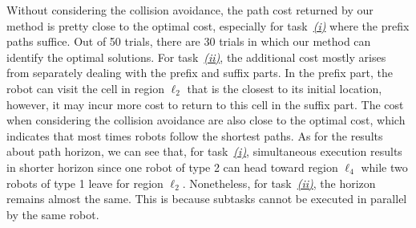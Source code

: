 \documentclass[Afour,sageh,times]{sagej}
\begin{document}
{{Without considering the collision avoidance, the path cost returned by our method is pretty close to the optimal cost, especially for task~\hyperref[task:i]{\it (i)} where the prefix paths suffice. Out of 50 trials, there are 30 trials in which our method can identify the optimal solutions. For task~\hyperref[task:ii]{\it (ii)}, the additional cost mostly arises from separately dealing with the prefix and suffix parts.  In the prefix part, the robot can visit the cell in region $\ell_2$ that is the closest to its initial location, however, it may incur more cost to return to this cell in the suffix part. The cost when considering the collision avoidance are also close to the optimal cost, which indicates that most times robots follow the shortest paths. As for the results about path horizon, we can see that, for task~\hyperref[task:i]{\it (i)}, simultaneous execution results in shorter horizon since one robot of type 2 can head toward region $\ell_4$ while two robots of type 1 leave for region $\ell_2$. Nonetheless, for task~\hyperref[task:ii]{\it (ii)}, the horizon remains almost the same. This is because subtasks cannot be executed in parallel by the same robot.



}}
\end{document}
